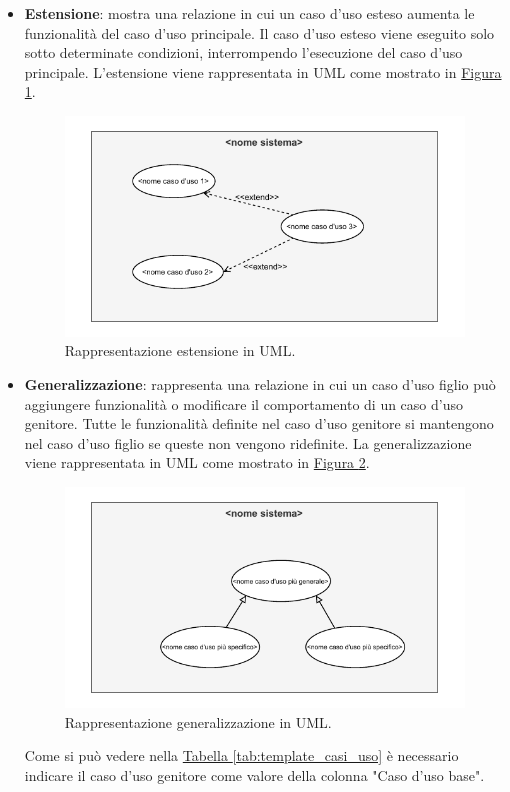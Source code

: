 \begin{itemize}
\begin{itemize}
        \item \textbf{Estensione}: mostra una relazione in cui un caso d'uso esteso aumenta le funzionalità del caso d'uso principale. Il caso d'uso esteso viene eseguito solo sotto determinate condizioni, interrompendo l'esecuzione del caso d'uso principale.
        L'estensione viene rappresentata in UML come mostrato in \hyperref[fig:estensione_uml]{Figura \ref{fig:estensione_uml}}.
        \begin{figure}[H]
            \centering
            \includegraphics{Sezioni/ProcessiPrimari/Immagini/estensione_uml.pdf}
            \caption{Rappresentazione estensione in UML.}
            \label{fig:estensione_uml}
        \end{figure}
        
        \item \textbf{Generalizzazione}: rappresenta una relazione in cui un caso d'uso figlio può aggiungere funzionalità o modificare il comportamento di un caso d'uso genitore. Tutte le funzionalità definite nel caso d'uso genitore si mantengono nel caso d'uso figlio se queste non vengono ridefinite.
        La generalizzazione viene rappresentata in UML come mostrato in \hyperref[fig:generalizzazione_uml]{Figura \ref{fig:generalizzazione_uml}}.
        \begin{figure}[H]
            \centering
            \includegraphics{Sezioni/ProcessiPrimari/Immagini/generalizzazione_uml.pdf}
            \caption{Rappresentazione generalizzazione in UML.}
            \label{fig:generalizzazione_uml}
        \end{figure}
        Come si può vedere nella \hyperref[tab:template_casi_uso]{Tabella \ref{tab:template_casi_uso}} è necessario indicare il caso d'uso genitore come valore della colonna "Caso d'uso base".


\end{itemize}
\end{itemize}
